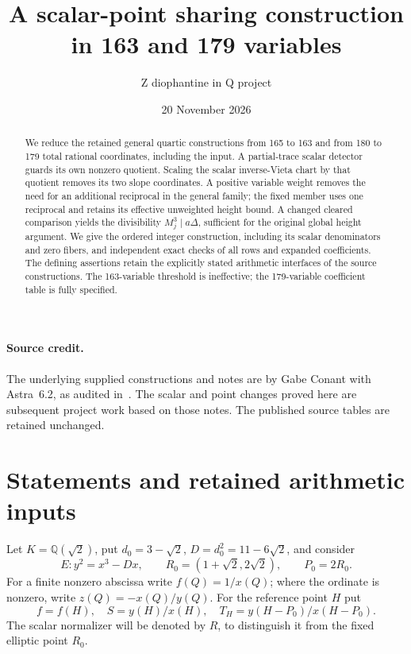 \documentclass[11pt]{article}
\title{A scalar-point sharing construction in 163 and 179 variables}
\author{Z diophantine in Q project}
\date{20 November 2026}
\theoremstyle{remark}\newtheorem{remark}[theorem]{Remark}
\newcommand{\Q}{\mathbb Q}\newcommand{\Z}{\mathbb Z}
\begin{document}
\maketitle
\begin{abstract}
We reduce the retained general quartic constructions from 165 to 163
and from 180 to 179 total rational coordinates, including the input.
A partial-trace scalar detector guards its own nonzero quotient.
Scaling the scalar inverse-Vieta chart by that quotient removes its
two slope coordinates. A positive variable weight removes the need
for an additional reciprocal in the general family; the fixed member
uses one reciprocal and retains its effective unweighted height bound. A changed cleared
comparison yields the divisibility $M_j^3\mid a\Delta$, sufficient
for the original global height argument. We give the ordered integer
construction, including its scalar denominators and zero fibers, and
independent exact checks of all rows and expanded coefficients.
The defining assertions retain the explicitly stated arithmetic
interfaces of the source constructions. The 163-variable threshold
is ineffective; the 179-variable coefficient table is fully specified.
\end{abstract}

\paragraph{Source credit.}
The underlying supplied constructions and notes are by Gabe Conant
with Astra~6.2, as audited in~\cite{Shared}. The scalar and point
changes proved here are subsequent project work based on those notes.
The published source tables are retained unchanged.

\section{Statements and retained arithmetic inputs}
Let $K=\Q(\sqrt2)$, put $d_0=3-\sqrt2$, $D=d_0^2=11-6\sqrt2$,
and consider
\[
 E:y^2=x^3-Dx,\qquad R_0=(1+\sqrt2,2\sqrt2),\qquad P_0=2R_0.
\]
For a finite nonzero abscissa write $f(Q)=1/x(Q)$; where the
ordinate is nonzero, write $z(Q)=-x(Q)/y(Q)$.
For the reference point $H$ put
\[
 f=f(H),\quad S=y(H)/x(H),\quad T_H=y(H-P_0)/x(H-P_0).
\]
The scalar normalizer will be denoted by $R$, to distinguish it
from the fixed elliptic point $R_0$.
\end{document}
